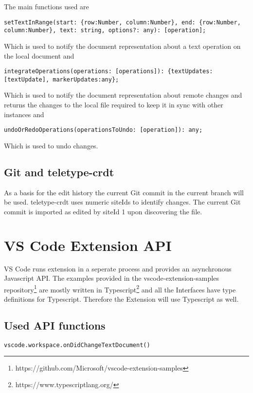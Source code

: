 The main functions used are

\begin{lstlisting}
setTextInRange(start: {row:Number, column:Number}, end: {row:Number, column:Number}, text: string, options?: any): [operation];
\end{lstlisting}
Which is used to notify the document representation about a text operation on the local document and
\begin{lstlisting}
integrateOperations(operations: [operations]): {textUpdates:[textUpdate], markerUpdates:any};
\end{lstlisting}
Which is used to notify the document representation about remote changes and returns the changes to the local file required to keep it in sync with other instances
and
\begin{lstlisting}
undoOrRedoOperations(operationsToUndo: [operation]): any;
\end{lstlisting}
Which is used to undo changes.

\subsection{Git and teletype-crdt}
As a basis for the edit history  the current Git commit in the current branch will be used. teletype-crdt uses numeric siteIds to identify changes. The current Git commit is imported as edited by siteId 1 upon discovering the file.

\section{VS Code Extension API}

VS Code runs extension in a seperate process and provides an asynchronous Javascript API.
The examples provided in the vscode-extension-samples repository\footnote{https://github.com/Microsoft/vscode-extension-samples} are mostly written in Typescript\footnote{https://www.typescriptlang.org/} and all the Interfaces have type definitions for Typescript.
Therefore the Extension will use Typescript as well.

\subsection{Used API functions}

\begin{lstlisting}
vscode.workspace.onDidChangeTextDocument()
\end{lstlisting}

